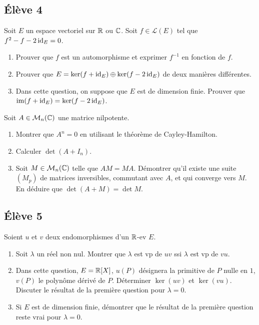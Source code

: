 \documentclass[10pt]{scrartcl}
\begin{document}
    \subsection*{Élève 4}
    \begin{ccp}
        Soit $E$ un espace vectoriel sur $\operatorname{\mathbb R}$ ou $\operatorname{\mathbb C}$. 
        Soit $f\in\mathcal L(E)$ tel que $f^2-f-2\operatorname{id}_E=0$.
        \begin{enumerate}
            \item Prouver que $f$ est un automorphisme et exprimer $f^{-1}$ en fonction de $f$.
            \item Prouver que $E = \operatorname{ker}(f+\operatorname{id}_E)\oplus\operatorname{ker}(f-2\operatorname{id}_E)$ de deux manières différentes.
            \item Dans cette question, on suppose que $E$ est de dimension finie. 
            Prouver que $\operatorname{im}(f+\operatorname{id}_E)=\operatorname{ker}(f-2\operatorname{id}_E)$.
        \end{enumerate}
    \end{ccp}
    
    \begin{exo}
        Soit $A\in\mathcal M_n(\operatorname{\mathbb C})$ une matrice nilpotente.
        \begin{enumerate}
            \item Montrer que $A^n=0$ en utilisant le théorème de Cayley-Hamilton.
            \item Calculer $\det(A+I_n)$.
            \item Soit $M\in\mathcal M_n(\operatorname{\mathbb C})$ telle que $AM=MA$.
            Démontrer qu'il existe une suite $(M_p)$ de matrices inversibles, commutant avec $A$,
            et qui converge vers $M$. En déduire que $\det(A+M)=\det M$.
        \end{enumerate}
    \end{exo}

    \subsection*{Élève 5}
    \begin{ccp}
        Soient $u$ et $v$ deux endomorphismes d'un $\operatorname{\mathbb R}$-ev $E$. 
        \begin{enumerate}
            \item Soit $\lambda$ un réel non nul. 
            Montrer que $\lambda$ est vp de $uv$ ssi $\lambda$ est vp de $vu$.
            \item Dans cette question, $E=\operatorname{\mathbb R}[X]$, $u(P)$ désignera la primitive de $P$ nulle en $1$, 
            $v(P)$ le polynôme dérivé de $P$. Déterminer $\ker(uv)$ et $\ker(vu)$. Discuter le résultat
            de la première question pour $\lambda=0$.
            \item Si $E$ est de dimension finie, démontrer que le résultat de la première question reste vrai 
            pour $\lambda = 0$.
        \end{enumerate}
    \end{ccp}
\end{document}
